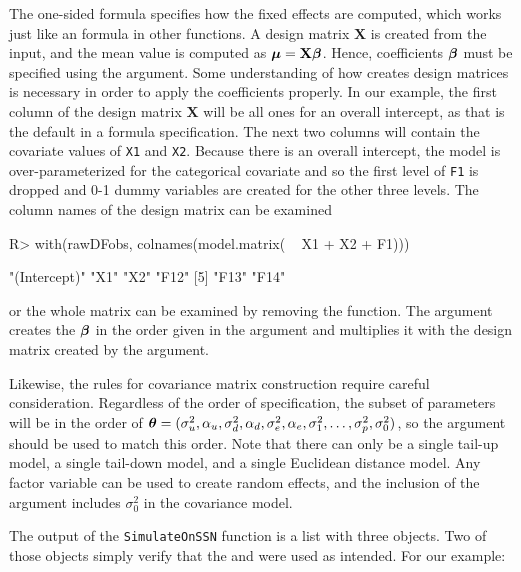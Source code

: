 \documentclass[nojss]{jss}
\renewenvironment{Schunk}{\vspace{\topsep}}{\vspace{\topsep}}
\def\btheta{\mbox{\boldmath $\theta$}}
\def\bbeta{\mbox{\boldmath $\beta$}}
\def\bmu{\mbox{\boldmath $\mu$}}
\def\bX{\textbf{X}}
\begin{document}
The one-sided formula specifies how the fixed effects are computed,
which works just like an  formula in other functions.  A
design matrix $\bX$ is created from the  input, and the
mean value is computed as $\bmu = \bX\bbeta$. Hence, coefficients
$\bbeta$ must be specified using the  argument.
Some understanding of how  creates design matrices is
necessary in order to apply the coefficients properly.  In our
example, the first column of the design matrix $\bX$ will be all ones
for an overall intercept, as that is the default in a formula
specification.  The next two columns will contain the covariate values
of {\tt X1} and {\tt X2}.  Because there is an overall intercept, the
model is over-parameterized for the categorical covariate and so the
first level of {\tt F1} is dropped and 0-1 dummy variables are created
for the other three levels. The column names of the design matrix can
be examined
\begin{Schunk}
\begin{Sinput}
R> with(rawDFobs, colnames(model.matrix( ~ X1 + X2 + F1)))
\end{Sinput}
\begin{Soutput}
[1] "(Intercept)" "X1"          "X2"          "F12"        
[5] "F13"         "F14"        
\end{Soutput}
\end{Schunk}
or the whole matrix can be examined by removing the 
function. The  argument creates the $\bbeta$ in the
order given in the argument and multiplies it with the design matrix
created by the  argument.

Likewise, the rules for covariance matrix construction require careful
consideration.  Regardless of the order of 
specification, the subset of parameters will be in the order of
$\btheta=(\sigma^2_u, \alpha_u,\sigma^2_d, \alpha_d, \sigma^2_e,
\alpha_e, \sigma^2_1, \ldots, \sigma^2_p, \sigma^2_0)$, so the
 argument should be used to match this order.  Note
that there can only be a single tail-up model, a single tail-down
model, and a single Euclidean distance model.  Any factor variable can
be used to create random effects, and the inclusion of the
 argument includes $\sigma^2_0$ in the covariance
model.

The output of the {\tt SimulateOnSSN} function is a list with three
objects.  Two of those objects simply verify that the
 and  were used as intended.  For
our example:
\end{document}
